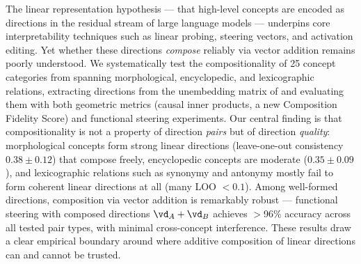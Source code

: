 The linear representation hypothesis --- that high-level concepts are encoded as directions in the residual stream of large language models --- underpins core interpretability techniques such as linear probing, steering vectors, and activation editing.
Yet whether these directions \emph{compose} reliably via vector addition remains poorly understood.
We systematically test the compositionality of 25 concept categories from \bats spanning morphological, encyclopedic, and lexicographic relations, extracting directions from the unembedding matrix of \pythia and evaluating them with both geometric metrics (causal inner products, a new Composition Fidelity Score) and functional steering experiments.
Our central finding is that compositionality is not a property of direction \emph{pairs} but of direction \emph{quality}: morphological concepts form strong linear directions (leave-one-out consistency $0.38 \pm 0.12$) that compose freely, encyclopedic concepts are moderate ($0.35 \pm 0.09$), and lexicographic relations such as synonymy and antonymy mostly fail to form coherent linear directions at all (many LOO $< 0.1$).
Among well-formed directions, composition via vector addition is remarkably robust --- functional steering with composed directions $\vd_A + \vd_B$ achieves $>$96\% accuracy across all tested pair types, with minimal cross-concept interference.
These results draw a clear empirical boundary around where additive composition of linear directions can and cannot be trusted.
